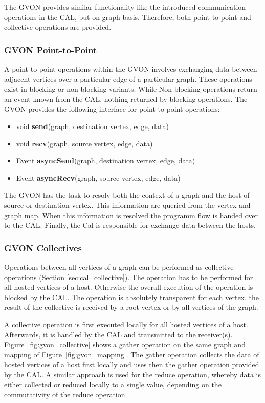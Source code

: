 The GVON provides similar functionality like the introduced
communication operations in the CAL, but on graph basis. Therefore,
both point-to-point and collective operations are provided.

\subsubsection*{GVON Point-to-Point}
A point-to-point operations within the GVON involves exchanging data
between adjacent vertices over a particular edge of a particular
graph.  These operations exist in blocking or non-blocking
variants. While Non-blocking operations return an event known from the
CAL, nothing returned by blocking operations. The GVON provides the
following interface for point-to-point operations:

\begin{itemize}
  \item [] void \textbf{send}(graph, destination vertex, edge, data)
  \item [] void \textbf{recv}(graph, source vertex, edge, data)
  \item [] Event \textbf{asyncSend}(graph, destination vertex, edge, data)
  \item [] Event \textbf{asyncRecv}(graph, source vertex, edge, data)
\end{itemize}

\noindent The GVON has the task to resolv both the context of a graph and the
host of source or destination vertex. This information are queried
from the vertex and graph map. When this information is resolved the
programm flow is handed over to the CAL. Finally, the Cal is
responsible for exchange data between the hosts.

\subsubsection*{GVON Collectives}
Operations between all vertices of a graph can be performed as
collective operations (Section \ref{sec:cal_collective}).  The
operation has to be performed for all hosted vertices of a
host. Otherwise the overall execution of the operation is blocked by
the CAL. The operation is absolutely transparent for each vertex.  the
result of the collective is received by a root vertex or by all
vertices of the graph.

A collective operation is first executed locally for all hosted
vertices of a host. Afterwards, it is handled by the CAL and
transmitted to the receiver(s). Figure~\ref{fig:gvon_collective} shows
a gather operation on the same graph and mapping of
Figure~\ref{fig:gvon_mapping}. The gather operation collects the data
of hosted vertices of a host first locally and uses then the gather
operation provided by the CAL. A similar approach is used for the
reduce operation, whereby data is either collected or reduced locally
to a single value, depending on the commutativity of the reduce
operation.

